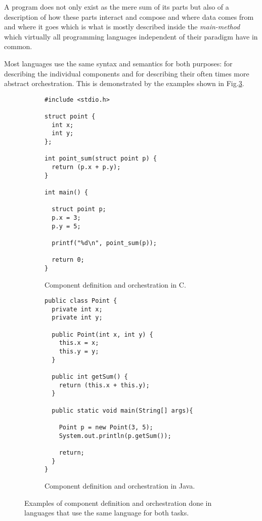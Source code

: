 A program does not only exist as the mere sum of its parts but
also of a description of how these parts interact and compose and
where data comes from and where it goes which is what is mostly
described inside the \textit{main-method} which virtually
all programming languages independent of their paradigm have in
common.

Most languages use the same syntax and semantics
for both purposes: for describing the individual components and for
describing their often times more abstract orchestration.
This is demonstrated by the examples shown in Fig.\ref{c-and-java}.

\begin{figure}[h!]
    \vspace{5mm}
    \begin{subfigure}[b]{0.41\textwidth}

    \begin{lstlisting}
#include <stdio.h>

struct point {
  int x;
  int y;
};

int point_sum(struct point p) {
  return (p.x + p.y);
}

int main() {

  struct point p;
  p.x = 3;
  p.y = 5;

  printf("%d\n", point_sum(p));

  return 0;
}
    \end{lstlisting}

      \caption{Component definition and orchestration in C.}
      \label{fig:c-example}
    \end{subfigure}
    \hfill
    \vspace{10pt}
    \begin{subfigure}[b]{0.54\textwidth}

    \begin{lstlisting}
public class Point {
  private int x;
  private int y;

  public Point(int x, int y) {
    this.x = x;
    this.y = y;
  }

  public int getSum() {
    return (this.x + this.y);
  }

  public static void main(String[] args){

    Point p = new Point(3, 5);
    System.out.println(p.getSum());

    return;
  }
}
    \end{lstlisting}

      \caption{Component definition and orchestration in Java.}
      \label{fig:java-example}
    \end{subfigure}

  \caption{Examples of component definition and orchestration done in
           languages that use the same language for both tasks.}
  \label{c-and-java}

\end{figure}

